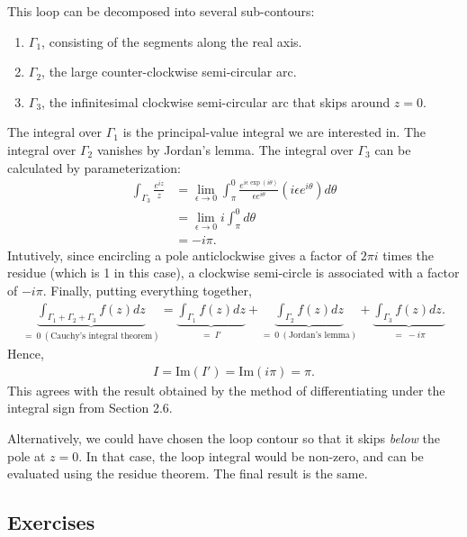 \documentclass[10pt,a4paper]{article}
\begin{document}
\noindent
This loop can be decomposed into several sub-contours:
\begin{enumerate}
\item  $\Gamma_1$, consisting of the segments along the real axis.
\item $\Gamma_2$, the large counter-clockwise semi-circular arc.
\item $\Gamma_3$, the infinitesimal clockwise semi-circular arc that skips around $z = 0$.
\end{enumerate}

\noindent
The integral over $\Gamma_1$ is the principal-value integral we are
interested in.  The integral over $\Gamma_2$ vanishes by Jordan's
lemma. The integral over $\Gamma_3$ can be calculated by
parameterization:
\begin{align}
  \int_{\Gamma_3} \frac{e^{iz}}{z} &= \lim_{\epsilon \rightarrow 0} \int_{\pi}^{0} \frac{e^{i\epsilon \exp(i\theta)}}{\epsilon e^{i\theta}} \left(i\epsilon e^{i\theta}\right) d\theta \\
  &= \lim_{\epsilon \rightarrow 0} i \int_{\pi}^0 d\theta \\
  &= - i\pi.
\end{align}
Intutively, since encircling a pole anticlockwise gives a factor of
$2\pi i$ times the residue (which is 1 in this case), a clockwise
semi-circle is associated with a factor of $- i \pi$. Finally, putting
everything together,
\begin{align}
  \underbrace{\int_{\Gamma_1 + \Gamma_2 + \Gamma_3} f(z) dz}_{ =~0~(\text{Cauchy's integral theorem})} = \underbrace{\int_{\Gamma_1} f(z) dz}_{=~I'} + \underbrace{\int_{\Gamma_2} f(z) dz}_{=~0~(\text{Jordan's lemma})} + \underbrace{\int_{\Gamma_3} f(z) dz.}_{=~-i \pi}
\end{align}
Hence,
\begin{align}
  I = \mathrm{Im}(I') = \mathrm{Im}(i\pi) = \pi.
\end{align}
This agrees with the result obtained by the method of differentiating
under the integral sign from Section 2.6.

Alternatively, we could have chosen the loop contour so that it skips
\textit{below} the pole at $z = 0$.  In that case, the loop integral
would be non-zero, and can be evaluated using the residue theorem.
The final result is the same.

\subsection{Exercises}
\label{exercises}
\end{document}
